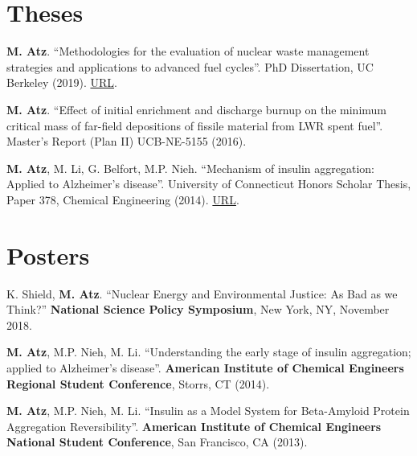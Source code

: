 \documentclass[margin,line]{resume}
\begin{document}
\begin{resume}
\section{\mysidestyle Theses\\}
\begin{bibenum}
    
    \item \textbf{M. Atz}. ``Methodologies for the evaluation of nuclear waste management strategies and applications to advanced fuel cycles''. PhD Dissertation, UC Berkeley (2019). \href{http://search.proquest.com/openview/bf6b3e374367e5f1164c84d313c6e783/1?pq-origsite=gscholar&cbl=18750&diss=y}{URL}.

    \item \textbf{M. Atz}. ``Effect of initial enrichment and discharge burnup on the minimum critical mass of far-field depositions of fissile material from LWR spent fuel''. Master's Report (Plan II) UCB-NE-5155 (2016).

    \item \textbf{M. Atz}, M. Li, G. Belfort, M.P. Nieh. ``Mechanism of insulin aggregation: Applied to Alzheimer’s disease''. University of Connecticut Honors Scholar Thesis, Paper 378, Chemical Engineering (2014). \href{https://opencommons.uconn.edu/cgi/viewcontent.cgi?referer=&httpsredir=1&article=1386&context=srhonors_theses}{URL}.
    
\end{bibenum}
\section{\mysidestyle Posters}
\begin{bibenum}

    \item K. Shield, \textbf{M. Atz}. ``Nuclear Energy and Environmental Justice: As Bad as we Think?'' \textbf{National Science Policy Symposium}, New York, NY, November 2018.
    
    \item \textbf{M. Atz}, M.P. Nieh, M. Li. ``Understanding the early stage of insulin aggregation; applied to Alzheimer’s disease''. \textbf{American Institute of Chemical Engineers Regional Student Conference}, Storrs, CT (2014).

    \item \textbf{M. Atz}, M.P. Nieh, M. Li. ``Insulin as a Model System for Beta-Amyloid Protein Aggregation Reversibility''. \textbf{American Institute of Chemical Engineers National Student Conference}, San Francisco, CA (2013).


\end{bibenum}
\end{resume}
\end{document}
